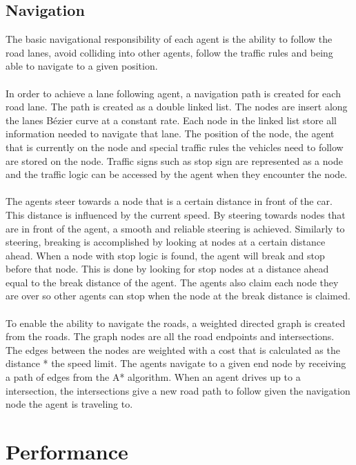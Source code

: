 \subsection{Navigation}
The basic navigational responsibility of each agent is the ability to follow the road lanes, avoid colliding into other agents, follow the traffic rules and being able to navigate to a given position.
\\\\
In order to achieve a lane following agent, a navigation path is created for each road lane. The path is created as a double linked list. The nodes are insert along the lanes Bézier curve at a constant rate. Each node in the linked list store all information needed to navigate that lane. The position of the node, the agent that is currently on the node and special traffic rules the vehicles need to follow are stored on the node. Traffic signs such as stop sign are represented as a node and the traffic logic can be accessed by the agent when they encounter the node. 
\\\\
The agents steer towards a node that is a certain distance in front of the car. This distance is influenced by the current speed. By steering towards nodes that are in front of the agent, a smooth and reliable steering is achieved. Similarly to steering, breaking is accomplished by looking at nodes at a certain distance ahead. When a node with stop logic is found, the agent will break and stop before that node. This is done by looking for stop nodes at a distance ahead equal to the break distance of the agent. The agents also claim each node they are over so other agents can stop when the node at the break distance is claimed.                                                
\\\\

To enable the ability to navigate the roads, a weighted directed graph is created from the roads.
The graph nodes are all the road endpoints and intersections. The edges between the nodes are weighted with a cost that is calculated as the distance * the speed limit.
The agents navigate to a given end node by receiving a path of edges from the A* algorithm. When an agent drives up to a intersection, the intersections give a new road path to follow given the navigation node the agent is traveling to.

\section{Performance}

